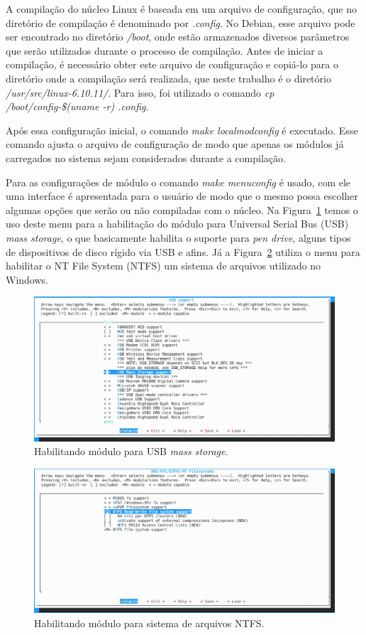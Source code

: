 \documentclass[
	12pt,				%
	oneside,   	        %
	a4paper,			%
	english,			%
	french,				%
	spanish,			%
	brazil,				%
	]{pacotes/abntex2}
\begin{document}
A compilação do núcleo Linux é baseada em um arquivo de configuração, que no diretório de compilação é denominado por \textit{.config}. No Debian, esse arquivo pode ser encontrado no diretório \textit{/boot}, onde estão armazenados diversos parâmetros que serão utilizados durante o processo de compilação. Antes de iniciar a compilação, é necessário obter este arquivo de configuração e copiá-lo para o diretório onde a compilação será realizada, que neste trabalho é o diretório \textit{/usr/src/linux-6.10.11/}. Para isso, foi utilizado o comando \textit{cp /boot/config-\$(uname -r) .config}.

Após essa configuração inicial, o comando \textit{make localmodconfig} é executado. Esse comando ajusta o arquivo de configuração de modo que apenas os módulos já carregados no sistema sejam considerados durante a compilação.

Para as configurações de módulo o comando \textit{make menuconfig} é usado, com ele uma interface é apresentada para o usuário de modo que o mesmo possa escolher algumas opções que serão ou não compiladas com o núcleo. Na Figura~\ref{fig:usb} temos o uso deste menu para a habilitação do módulo para Universal Serial Bus (USB) \textit{mass storage}, o que basicamente habilita o suporte para \textit{pen drive}, alguns tipos de dispositivos de disco rígido via USB e afins. Já a Figura~\ref{fig:ntfs} utiliza o menu para habilitar o NT File System (NTFS) um sistema de arquivos utilizado no Windows.

\begin{figure}[H]
  \centering
  \includegraphics[scale=0.3]{figuras/usb.png}
  \caption{Habilitando módulo para USB \textit{mass storage}.}
  \label{fig:usb}
\end{figure}

\begin{figure}[H]
  \centering
  \includegraphics[scale=0.3]{figuras/ntfs.png}
  \caption{Habilitando módulo para sistema de arquivos NTFS.}
  \label{fig:ntfs}
\end{figure}
\end{document}
